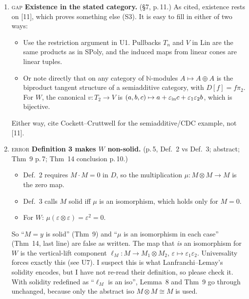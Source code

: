 \documentclass[11pt]{article}
\newcommand{\N}{\mathbb{N}}
\newcommand{\iss}[1]{\textsc{#1}}
\begin{document}
\begin{enumerate}[label=\textbf{U\arabic*.},leftmargin=*]
\item \iss{gap} \textbf{Existence in the stated category.} (\S7, p.\,11.) As cited, existence rests
on [11], which proves something else (S3). It is easy to fill in either of two ways:
\begin{itemize}[leftmargin=1.2em]
\item Use the restriction argument in U1. Pullbacks $T_n$ and $V$ in Lin are the same products as in
SPoly, and the induced maps from linear cones are linear tuples.
\item Or note directly that on any category of $\N$-modules $A\mapsto A\oplus A$ is the biproduct
tangent structure of a semiadditive category, with $D[f]=f\pi_2$. For $W$, the canonical
$v\colon T_2\to V$ is $(a,b,c)\mapsto a+\varepsilon_{\rm in}c+\varepsilon_1\varepsilon_2 b$, which
is bijective.
\end{itemize}
Either way, cite Cockett--Cruttwell for the semiadditive/CDC example, not [11].

\item \iss{error} \textbf{Definition 3 makes $W$ non-solid.} (p.\,5, Def.~2 vs Def.~3; abstract;
Thm~9 p.\,7; Thm~14 conclusion p.\,10.)
\begin{itemize}[leftmargin=1.2em]
\item Def.~2 requires $M\cdot M=0$ in $D$, so the multiplication $\mu\colon M\otimes M\to M$ is the
zero map.
\item Def.~3 calls $M$ solid iff $\mu$ is an isomorphism, which holds only for $M=0$.
\item For $W$: $\mu(\varepsilon\otimes\varepsilon)=\varepsilon^2=0$.
\end{itemize}
So ``$M=y$ is solid'' (Thm~9) and ``$\mu$ is an isomorphism in each case'' (Thm~14, last line) are
false as written. The map that \emph{is} an isomorphism for $W$ is the vertical-lift component
$\ell_M\colon M\to M_1\otimes M_2$, $\varepsilon\mapsto\varepsilon_1\varepsilon_2$. Universality
forces exactly this (see U7). I suspect this is what Lanfranchi--Lemay's solidity encodes, but I
have not re-read their definition, so please check it. With solidity redefined as ``$\ell_M$ is an
iso'', Lemma~8 and Thm~9 go through unchanged, because only the abstract iso
$M\otimes M\cong M$ is used.


\end{enumerate}
\end{document}
